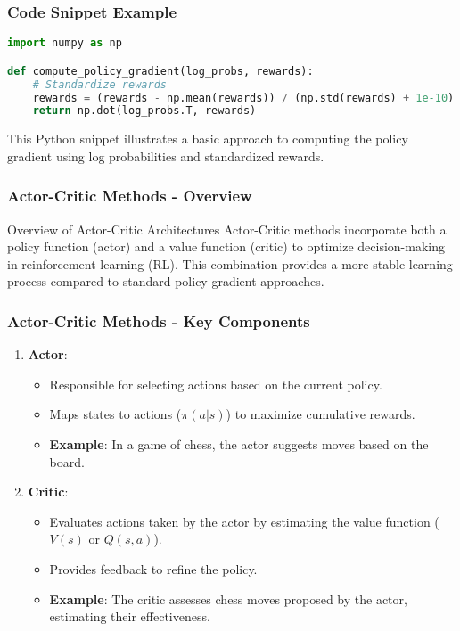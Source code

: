 \documentclass{beamer}
\begin{document}
\begin{frame}[fragile]
    \frametitle{Code Snippet Example}
    \begin{lstlisting}[language=Python]
import numpy as np

def compute_policy_gradient(log_probs, rewards):
    # Standardize rewards
    rewards = (rewards - np.mean(rewards)) / (np.std(rewards) + 1e-10)
    return np.dot(log_probs.T, rewards)
    \end{lstlisting}
    This Python snippet illustrates a basic approach to computing the policy gradient using log probabilities and standardized rewards.
\end{frame}

\begin{frame}[fragile]
    \frametitle{Actor-Critic Methods - Overview}
    \begin{block}{Overview of Actor-Critic Architectures}
        Actor-Critic methods incorporate both a policy function (actor) and a value function (critic) to optimize decision-making in reinforcement learning (RL). This combination provides a more stable learning process compared to standard policy gradient approaches.
    \end{block}
\end{frame}

\begin{frame}[fragile]
    \frametitle{Actor-Critic Methods - Key Components}
    \begin{enumerate}
        \item \textbf{Actor}: 
        \begin{itemize}
            \item Responsible for selecting actions based on the current policy.
            \item Maps states to actions ($\pi(a|s)$) to maximize cumulative rewards.
            \item \textbf{Example}: In a game of chess, the actor suggests moves based on the board.
        \end{itemize}
        
        \item \textbf{Critic}:
        \begin{itemize}
            \item Evaluates actions taken by the actor by estimating the value function ($V(s)$ or $Q(s, a)$).
            \item Provides feedback to refine the policy.
            \item \textbf{Example}: The critic assesses chess moves proposed by the actor, estimating their effectiveness.
        \end{itemize}
    \end{enumerate}
\end{frame}
\end{document}
